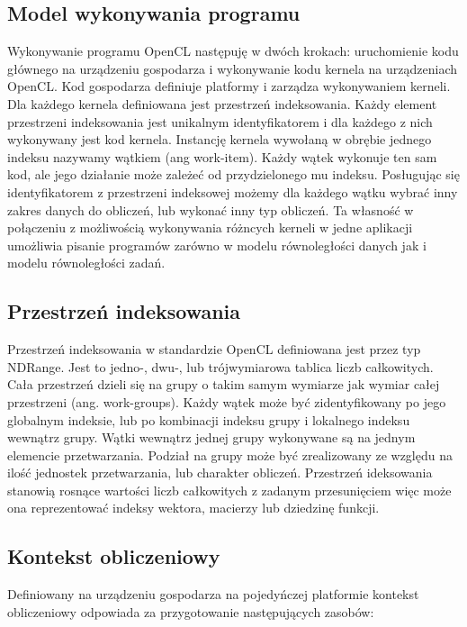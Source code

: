\subsection{Model wykonywania programu}\label{sec:mwp}

Wykonywanie programu OpenCL następuję w dwóch krokach: uruchomienie kodu głównego na urządzeniu gospodarza i wykonywanie kodu kernela na urządzeniach OpenCL. Kod gospodarza definiuje platformy i zarządza wykonywaniem kerneli. Dla każdego kernela definiowana jest przestrzeń indeksowania. Każdy element przestrzeni indeksowania jest unikalnym identyfikatorem i dla każdego z nich wykonywany jest kod kernela. Instancję kernela wywołaną w obrębie jednego indeksu nazywamy wątkiem (ang work-item). Każdy wątek wykonuje ten sam kod, ale jego działanie może zależeć od przydzielonego mu indeksu. Posługując się identyfikatorem z przestrzeni indeksowej możemy dla każdego wątku wybrać inny zakres danych do obliczeń, lub wykonać inny typ obliczeń. Ta własność w połączeniu z możliwością wykonywania różncych kerneli w jedne aplikacji umożliwia pisanie programów zarówno w modelu równoległości danych jak i modelu równoległości zadań.

\subsection{Przestrzeń indeksowania}\label{sec:OpenC5L}

Przestrzeń indeksowania w standardzie OpenCL definiowana jest przez typ NDRange. Jest to jedno-, dwu-, lub trójwymiarowa tablica liczb całkowitych. Cała przestrzeń dzieli się na grupy o takim samym wymiarze jak wymiar całej przestrzeni (ang. work-groups). Każdy wątek może być zidentyfikowany po jego globalnym indeksie, lub po kombinacji indeksu grupy i lokalnego indeksu wewnątrz grupy. Wątki wewnątrz jednej grupy wykonywane są na jednym elemencie przetwarzania. Podział na grupy może być zrealizowany ze względu na ilość jednostek przetwarzania, lub charakter obliczeń. Przestrzeń ideksowania stanowią rosnące wartości liczb całkowitych z zadanym przesunięciem więc może ona reprezentować indeksy wektora, macierzy lub dziedzinę funkcji.

\subsection{Kontekst obliczeniowy}\label{sec:OpenC2L}

Definiowany na urządzeniu gospodarza na pojedyńczej platformie kontekst obliczeniowy odpowiada za przygotowanie następujących zasobów:

